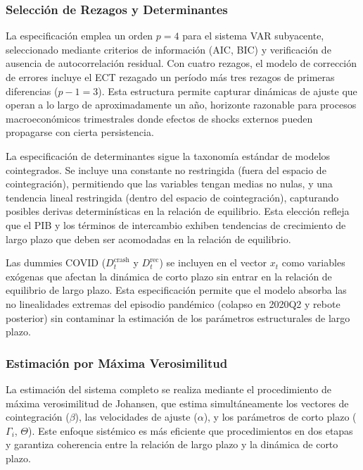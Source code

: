 \documentclass[3p,11pt,draft,natbib=false]{elsarticle}
\begin{document}
\subsubsection{Selección de Rezagos y Determinantes}

La especificación emplea un orden $p=4$ para el sistema VAR subyacente, seleccionado mediante criterios de información (AIC, BIC) y verificación de ausencia de autocorrelación residual. Con cuatro rezagos, el modelo de corrección de errores incluye el ECT rezagado un período más tres rezagos de primeras diferencias ($p-1=3$). Esta estructura permite capturar dinámicas de ajuste que operan a lo largo de aproximadamente un año, horizonte razonable para procesos macroeconómicos trimestrales donde efectos de shocks externos pueden propagarse con cierta persistencia.

La especificación de determinantes sigue la taxonomía estándar de modelos cointegrados. Se incluye una constante no restringida (fuera del espacio de cointegración), permitiendo que las variables tengan medias no nulas, y una tendencia lineal restringida (dentro del espacio de cointegración), capturando posibles derivas determinísticas en la relación de equilibrio. Esta elección refleja que el PIB y los términos de intercambio exhiben tendencias de crecimiento de largo plazo que deben ser acomodadas en la relación de equilibrio.

Las dummies COVID ($D^{\text{crash}}_t$ y $D^{\text{rec}}_t$) se incluyen en el vector $x_t$ como variables exógenas que afectan la dinámica de corto plazo sin entrar en la relación de equilibrio de largo plazo. Esta especificación permite que el modelo absorba las no linealidades extremas del episodio pandémico (colapso en 2020Q2 y rebote posterior) sin contaminar la estimación de los parámetros estructurales de largo plazo.

\subsubsection{Estimación por Máxima Verosimilitud}

La estimación del sistema completo se realiza mediante el procedimiento de máxima verosimilitud de Johansen, que estima simultáneamente los vectores de cointegración ($\beta$), las velocidades de ajuste ($\alpha$), y los parámetros de corto plazo ($\Gamma_i$, $\Theta$). Este enfoque sistémico es más eficiente que procedimientos en dos etapas y garantiza coherencia entre la relación de largo plazo y la dinámica de corto plazo.
\end{document}
